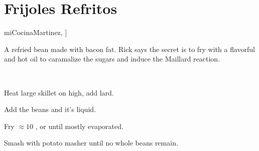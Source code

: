 \section{Frijoles Refritos}\label{frijoles_refritos}

\begin{recipestats}[
        preptime=5 \minute,
        servings=6 C,
        bakingtime=20 \minute,
        original=\citeauthor{miCocinaMartinez}~\cite[p.55]{miCocinaMartinez},
    ]
\end{recipestats}

\begin{recipeabstract}
    A refried bean made with bacon fat.
    Rick says the secret is to fry with a flavorful and hot oil to caramalize the sugars and induce the
    Maillard reaction.
\end{recipeabstract}

\begin{ingredientcolumns}[1]
    \begin{ingredientblock}
        \\
    \end{ingredientblock}
\end{ingredientcolumns}

\begin{preparation}
\item Heat large skillet on high, add lard.
\item Add the beans and it's liquid.
\item Fry $\approx 10$ \minute, or until mostly evaporated.
\item Smash with potato masher until no whole beans remain.
\end{preparation}

\recipeend%
